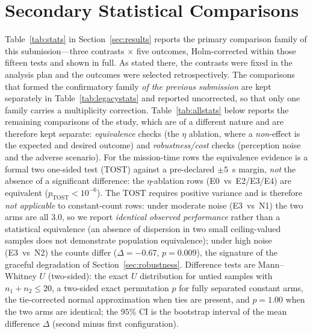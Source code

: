 \section{Secondary Statistical Comparisons}
\label{app:stats}
Table~\ref{tab:stats} in Section~\ref{sec:results} reports the primary comparison
family of this submission---three contrasts $\times$ five outcomes, Holm-corrected
within those fifteen tests and shown in full. As stated there, the contrasts were
fixed in the analysis plan and the outcomes were selected retrospectively. The comparisons that formed the
confirmatory family \emph{of the previous submission} are kept separately in
Table~\ref{tab:legacystats} and reported uncorrected, so that only one family
carries a multiplicity correction. Table~\ref{tab:allstats} below reports the remaining
comparisons of the study, which are of a different nature and are therefore kept
separate: \emph{equivalence} checks (the $\eta$ ablation, where a \emph{non}-effect
is the expected and desired outcome) and \emph{robustness/cost} checks
(perception noise and the adverse scenario). For the mission-time rows the equivalence evidence
is a formal two one-sided test (TOST) against a pre-declared $\pm5$~s margin,
\emph{not} the absence of a significant difference: the $\eta$-ablation rows
(E0~vs~E2/E3/E4) are equivalent ($p_{\mathrm{TOST}}<10^{-6}$). The TOST requires
positive variance and is therefore \emph{not applicable} to constant-count rows:
under moderate noise (E3~vs~N1) the two arms are all $3.0$, so we report
\emph{identical observed performance} rather than a statistical equivalence
(an absence of dispersion in two small ceiling-valued samples does not demonstrate
population equivalence); under high noise (E3~vs~N2) the counts differ
($\Delta=-0.67$, $p=0.009$), the signature of the graceful degradation of
Section~\ref{sec:robustness}. Difference tests are Mann--Whitney $U$ (two-sided): the exact $U$ distribution for
untied samples with $n_1+n_2\le20$, a two-sided exact permutation $p$ for fully
separated constant arms, the tie-corrected normal approximation when ties are
present, and $p{=}1.00$ when the two arms are identical; the $95\%$ CI is the
bootstrap interval of the mean difference $\Delta$ (second minus first
configuration).

